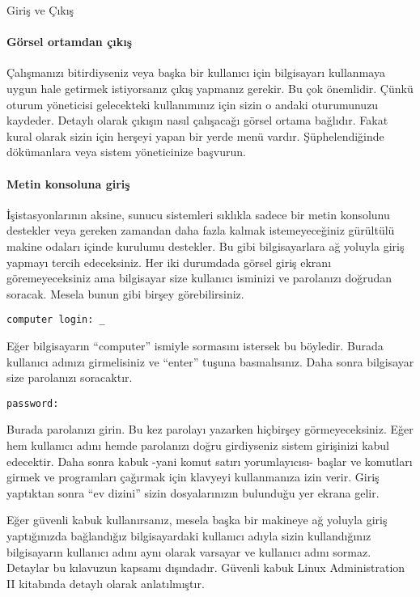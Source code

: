 \documentclass[10pt,a5paper]{book}
\begin{document}
\begin{section}{Giriş ve Çıkış}
\paragraph{Görsel ortamdan çıkış} {Çalışmanızı bitirdiyseniz veya başka bir kullanıcı için bilgisayarı kullanmaya uygun hale getirmek istiyorsanız çıkış yapmanız gerekir. Bu çok önemlidir. Çünkü oturum yöneticisi gelecekteki kullanımınız için sizin o andaki oturumunuzu kaydeder. Detaylı olarak çıkışın nasıl çalışacağı görsel  ortama bağlıdır. Fakat kural olarak sizin için herşeyi yapan bir yerde menü vardır. Şüphelendiğinde dökümanlara veya sistem yöneticinize başvurun.}

\paragraph{Metin konsoluna giriş}{ İşistasyonlarının aksine, sunucu sistemleri sıklıkla sadece bir metin konsolunu destekler veya gereken zamandan daha fazla kalmak istemeyeceğiniz gürültülü makine odaları içinde kurulumu destekler. Bu gibi bilgisayarlara ağ yoluyla giriş yapmayı tercih edeceksiniz. Her iki durumdada görsel giriş ekranı göremeyeceksiniz ama bilgisayar size kullanıcı isminizi ve parolanızı doğrudan soracak. Mesela bunun gibi birşey görebilirsiniz.}

\begin{verbatim}
computer login: _
\end{verbatim}

Eğer bilgisayarın “computer” ismiyle sormasını istersek bu böyledir. Burada kullanıcı adınızı girmelisiniz ve “enter” tuşuna basmalısınız. Daha sonra bilgisayar size parolanızı soracaktır. 

\begin{verbatim}
password:
\end{verbatim}

Burada parolanızı girin. Bu kez parolayı yazarken hiçbirşey görmeyeceksiniz. Eğer hem kullanıcı adını hemde parolanızı doğru girdiyseniz sistem girişinizi kabul edecektir. Daha sonra kabuk -yani komut satırı yorumlayıcısı- başlar ve komutları girmek ve programları çağırmak için klavyeyi kullanmanıza izin verir. Giriş yaptıktan sonra “ev dizini” sizin dosyalarınızın bulunduğu yer ekrana gelir.

Eğer güvenli kabuk kullanırsanız, mesela başka bir makineye ağ yoluyla giriş yaptığınızda bağlandığız bilgisayardaki kullanıcı adıyla sizin kullandığınız bilgisayarın kullanıcı adını aynı olarak varsayar ve kullanıcı adını sormaz. Detaylar bu kılavuzun kapsamı dışındadır. Güvenli kabuk Linux Administration II kitabında detaylı olarak anlatılmıştır.


\end{section}
\end{document}
